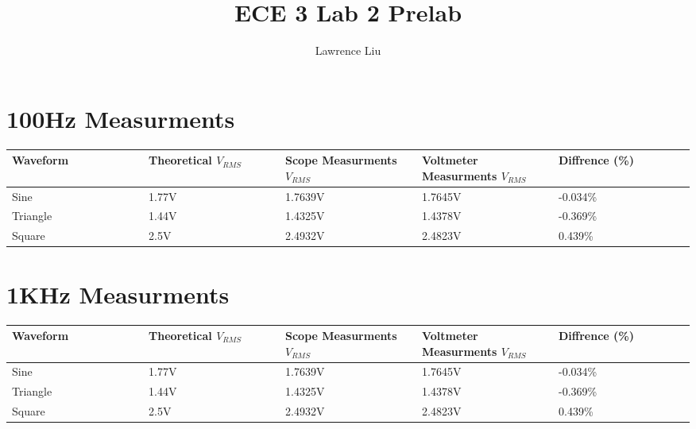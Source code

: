 \documentclass[12pt]{article}
\title{ECE 3 Lab 2 Prelab}
\author{Lawrence Liu}
\begin{document}
\maketitle
\section*{100Hz Measurments}
\begin{center}
    \begin{tabular}{|p{0.2\linewidth} | p{0.2\linewidth} |p{0.2\linewidth} |p{0.2\linewidth} |p{0.2\linewidth} |} 
     \hline
     Waveform & Theoretical $V_{RMS}$ & Scope Measurments $V_{RMS}$ & Voltmeter Measurments $V_{RMS}$& Diffrence (\%) \\ [0.5ex] 
     \hline\hline
     Sine & 1.77V & 1.7639V & 1.7645V &  -0.034\%\\
     \hline
     Triangle & 1.44V & 1.4325V & 1.4378V & -0.369\%\\
     \hline
     Square & 2.5V & 2.4932V & 2.4823V & 0.439\%\\ 
     \hline
    \end{tabular}
\end{center}
\section*{1KHz Measurments}
\begin{center}
    \begin{tabular}{|p{0.2\linewidth} | p{0.2\linewidth} |p{0.2\linewidth} |p{0.2\linewidth} |p{0.2\linewidth} |} 
     \hline
     Waveform & Theoretical $V_{RMS}$ & Scope Measurments $V_{RMS}$ & Voltmeter Measurments $V_{RMS}$& Diffrence (\%) \\ [0.5ex] 
     \hline\hline
     Sine & 1.77V & 1.7639V & 1.7645V &  -0.034\%\\
     \hline
     Triangle & 1.44V & 1.4325V & 1.4378V & -0.369\%\\
     \hline
     Square & 2.5V & 2.4932V & 2.4823V & 0.439\%\\ 
     \hline
    \end{tabular}
\end{center}
\end{document}
